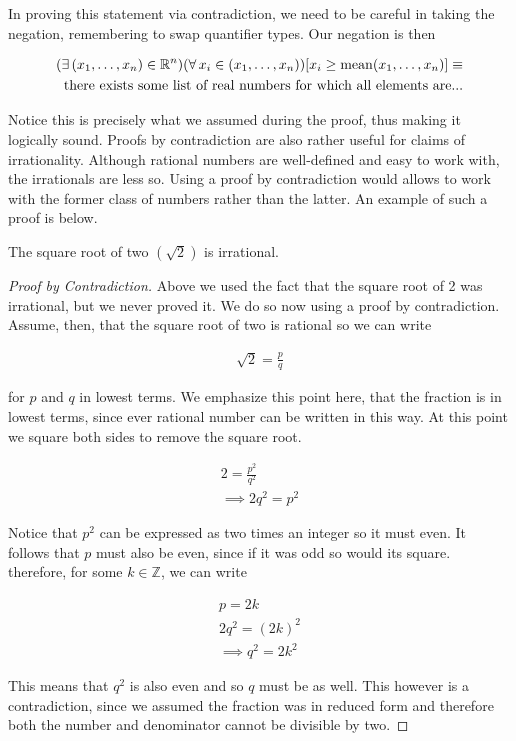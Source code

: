 In proving this statement via contradiction, we need to be careful in taking the negation, remembering to swap quantifier types. Our negation is then

\begin{align*}
	(\exists \, (x_1, \dots, x_n) \in \mathbb{R}^n)(\forall \, x_i \in (x_1, \dots, x_n))[x_i \ge \operatorname{mean}(x_1, \dots, x_n)] \equiv \\
	\text{there exists some list of real numbers for which all elements are...}
\end{align*}

Notice this is precisely what we assumed during the proof, thus making it logically sound. Proofs by contradiction are also rather useful for claims of irrationality. Although rational numbers are well-defined and easy to work with, the irrationals are less so. Using a proof by contradiction would allows to work with the former class of numbers rather than the latter. An example of such a proof is below.

\vspace{\baselineskip}
\begin{theorem}
	The square root of two $(\sqrt{2})$ is irrational.
\end{theorem}

\begin{proof}[Proof by Contradiction]
	Above we used the fact that the square root of 2 was irrational, but we never proved it. We do so now using a proof by contradiction. Assume, then, that the square root of two is rational so we can write
	
	\begin{align*}
		\sqrt{2} = \frac{p}{q}
	\end{align*}
	
	for $p$ and $q$ in lowest terms. We emphasize this point here, that the fraction is in lowest terms, since ever rational number can be written in this way. At this point we square both sides to remove the square root.
	
	\begin{align*}
		2 = \frac{p^2}{q^2} \\
		\implies 2 q^2 = p^2
	\end{align*}
	
	Notice that $p^2$ can be expressed as two times an integer so it must even. It follows that $p$ must also be even, since if it was odd so would its square. therefore, for some $k \in \mathbb{Z}$, we can write
	
	\begin{align*}
		p = 2k \\
		2 q^2 = (2k)^2 \\
		\implies q^2 = 2k^2
	\end{align*}
	
	This means that $q^2$ is also even and so $q$ must be as well. This however is a contradiction, since we assumed the fraction was in reduced form and therefore both the number and denominator cannot be divisible by two.
\end{proof}
\vspace{\baselineskip}


